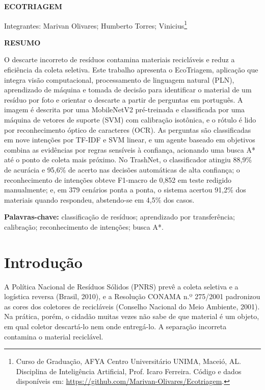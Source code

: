 \documentclass[12pt,a4paper]{article}
\newcommand{\repo}{\url{https://github.com/Marivan-Olivares/Ecotriagem}}
\newcommand{\secaosemnumero}[1]{\begin{center}\textbf{\MakeUppercase{#1}}\end{center}}
\begin{document}
\thispagestyle{fancy}

\begin{center}
\textbf{ECOTRIAGEM}
\end{center}

\vspace{12pt}
\noindent Integrantes: Marivan Olivares; Humberto Torres; Vinicius\footnote{Curso de Graduação, AFYA Centro Universitário UNIMA, Maceió, AL. Disciplina de Inteligência Artificial, Prof. Icaro Ferreira. Código e dados disponíveis em: \repo.}

\vspace{6pt}
\begin{singlespace}
\secaosemnumero{Resumo}
O descarte incorreto de resíduos contamina materiais recicláveis e reduz a eficiência da coleta seletiva. Este trabalho apresenta o EcoTriagem, aplicação que integra visão computacional, processamento de linguagem natural (PLN), aprendizado de máquina e tomada de decisão para identificar o material de um resíduo por foto e orientar o descarte a partir de perguntas em português. A imagem é descrita por uma MobileNetV2 pré-treinada e classificada por uma máquina de vetores de suporte (SVM) com calibração isotônica, e o rótulo é lido por reconhecimento óptico de caracteres (OCR). As perguntas são classificadas em nove intenções por TF-IDF e SVM linear, e um agente baseado em objetivos combina as evidências por regras sensíveis à confiança, acionando uma busca A* até o ponto de coleta mais próximo. No TrashNet, o classificador atingiu 88,9\% de acurácia e 95,6\% de acerto nas decisões automáticas de alta confiança; o reconhecimento de intenções obteve F1-macro de 0,852 em teste redigido manualmente; e, em 379 cenários ponta a ponta, o sistema acertou 91,2\% dos materiais quando respondeu, abstendo-se em 4,5\% dos casos.

\vspace{12pt}
\noindent\textbf{Palavras-chave:} classificação de resíduos; aprendizado por transferência; calibração; reconhecimento de intenções; busca A*.

\end{singlespace}

\section{Introdução}
A Política Nacional de Resíduos Sólidos (PNRS) prevê a coleta seletiva e a logística reversa (Brasil, 2010), e a Resolução CONAMA n.º 275/2001 padronizou as cores dos coletores de recicláveis (Conselho Nacional do Meio Ambiente, 2001). Na prática, porém, o cidadão muitas vezes não sabe de que material é um objeto, em qual coletor descartá-lo nem onde entregá-lo. A separação incorreta contamina o material reciclável.
\end{document}
